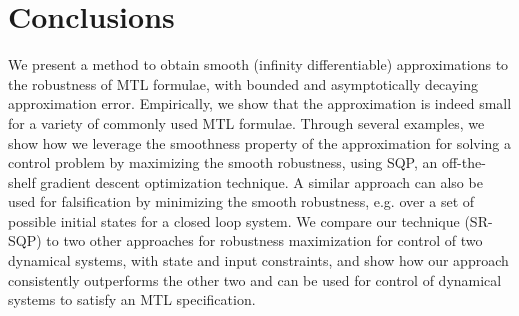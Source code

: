 \section{Conclusions}
We present a method to obtain smooth (infinity differentiable) approximations to the robustness of MTL formulae, with bounded and asymptotically decaying approximation error. 
Empirically, we show that the approximation is indeed small for a variety of commonly used MTL formulae. 
Through several examples, we show how we leverage the smoothness property of the approximation for solving a control problem by maximizing the smooth robustness, using SQP, an off-the-shelf gradient descent optimization technique. A similar approach can also be used for falsification by minimizing the smooth robustness, e.g. over a set of possible initial states for a closed loop system.
We compare our technique (SR-SQP) to two other approaches for robustness maximization for control of two dynamical systems, with state and input constraints, and show how our approach consistently outperforms the other two and can be used for control of dynamical systems to satisfy an MTL specification.

